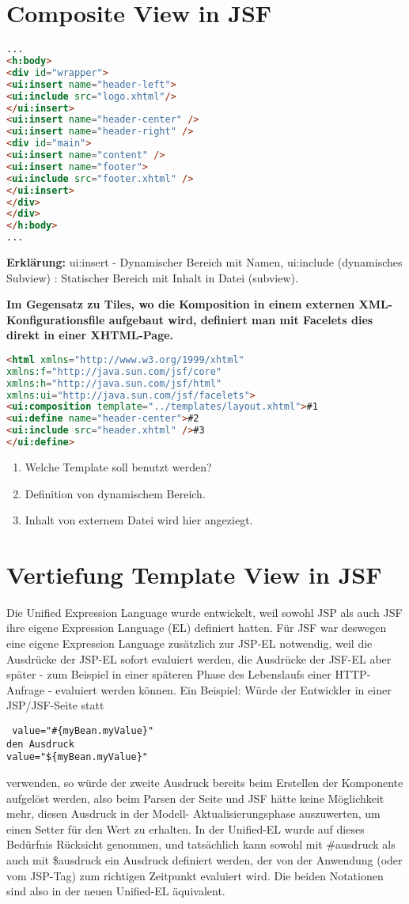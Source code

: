 \documentclass[a4paper,10pt]{scrreprt}
\begin{document}
{\section{Composite View in JSF}
\begin{lstlisting}[caption=CompositeView Beispiel JSF,language=html]
 ...
<h:body>
<div id="wrapper">
<ui:insert name="header-left">
<ui:include src="logo.xhtml"/>
</ui:insert>
<ui:insert name="header-center" />
<ui:insert name="header-right" />
<div id="main">
<ui:insert name="content" />
<ui:insert name="footer">
<ui:include src="footer.xhtml" />
</ui:insert>
</div>
</div>
</h:body>
...
\end{lstlisting}
\textbf{Erklärung:} ui:insert - Dynamischer Bereich mit Namen, ui:include (dynamisches Subview) : Statischer Bereich mit Inhalt in Datei (subview).

\textbf{Im Gegensatz zu Tiles, wo die Komposition in einem externen XML-Konfigurationsfile aufgebaut
wird, definiert man mit Facelets dies direkt in einer XHTML-Page.}
\begin{lstlisting}[caption=JSF Dynamisches Subview,language=html]
 <html xmlns="http://www.w3.org/1999/xhtml"
xmlns:f="http://java.sun.com/jsf/core"
xmlns:h="http://java.sun.com/jsf/html"
xmlns:ui="http://java.sun.com/jsf/facelets"> 
<ui:composition template="../templates/layout.xhtml">#1
<ui:define name="header-center">#2
<ui:include src="header.xhtml" />#3
</ui:define>
\end{lstlisting}
\begin{enumerate}
 \item  Welche Template soll benutzt werden?
 \item  Definition von dynamischem Bereich.
 \item  Inhalt von externem Datei wird hier angeziegt.
\end{enumerate}
\section{Vertiefung Template View in JSF}
Die Unified Expression Language wurde entwickelt, weil sowohl JSP als auch JSF ihre eigene
Expression Language (EL) definiert hatten. Für JSF war deswegen eine eigene Expression
Language zusätzlich zur JSP-EL notwendig, weil die Ausdrücke der JSP-EL sofort evaluiert werden,
die Ausdrücke der JSF-EL aber später - zum Beispiel in einer späteren Phase des Lebenslaufs einer
HTTP-Anfrage - evaluiert werden können. Ein Beispiel: Würde der Entwickler in einer JSP/JSF-Seite
statt
\begin{verbatim}
 value="#{myBean.myValue}"
den Ausdruck
value="${myBean.myValue}"
\end{verbatim}
verwenden, so würde der zweite Ausdruck bereits beim Erstellen der Komponente aufgelöst werden,
also beim Parsen der Seite und JSF hätte keine Möglichkeit mehr, diesen Ausdruck in der Modell-
Aktualisierungsphase auszuwerten, um einen Setter für den Wert zu erhalten. In der Unified-EL
wurde auf dieses Bedürfnis Rücksicht genommen, und tatsächlich kann sowohl mit \#{ausdruck} als
auch mit \${ausdruck} ein Ausdruck definiert werden, der von der Anwendung (oder vom JSP-Tag)
zum richtigen Zeitpunkt evaluiert wird. Die beiden Notationen sind also in der neuen Unified-EL
äquivalent.

}
\end{document}
